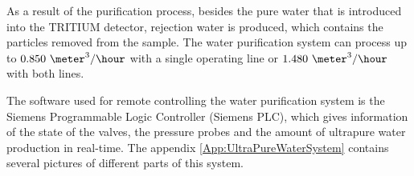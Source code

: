 As a result of the purification process, besides the pure water that is introduced into the TRITIUM detector, rejection water is produced,  which contains the particles removed from the sample. The water purification system can process up to $0.850~\meter^3/\hour$ with a single operating line or $1.480~\meter^3/\hour$ with both lines.

The software used for remote controlling the water purification system is the Siemens Programmable Logic Controller (Siemens PLC), which gives information of the state of the valves, the pressure probes and the amount of ultrapure water production in real-time. The appendix \ref{App:UltraPureWaterSystem} contains several pictures of different parts of this system.